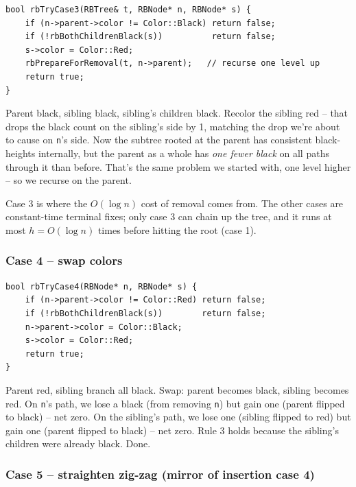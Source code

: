 \documentclass[11pt]{article}
\begin{document}
\begin{lstlisting}[basicstyle=\ttfamily\small,frame=single]
bool rbTryCase3(RBTree& t, RBNode* n, RBNode* s) {
    if (n->parent->color != Color::Black) return false;
    if (!rbBothChildrenBlack(s))          return false;
    s->color = Color::Red;
    rbPrepareForRemoval(t, n->parent);   // recurse one level up
    return true;
}
\end{lstlisting}

Parent black, sibling black, sibling's children black. Recolor the sibling red -- that drops the black count on the sibling's side by 1, matching the drop we're about to cause on \texttt{n}'s side. Now the subtree rooted at the parent has consistent black-heights internally, but the parent as a whole has \emph{one fewer black} on all paths through it than before. That's the same problem we started with, one level higher -- so we recurse on the parent.

\begin{ideabox}
Case 3 is where the $O(\log n)$ cost of removal comes from. The other cases are constant-time terminal fixes; only case 3 can chain up the tree, and it runs at most $h = O(\log n)$ times before hitting the root (case 1).
\end{ideabox}

\subsubsection*{Case 4 -- swap colors}

\begin{lstlisting}[basicstyle=\ttfamily\small,frame=single]
bool rbTryCase4(RBNode* n, RBNode* s) {
    if (n->parent->color != Color::Red) return false;
    if (!rbBothChildrenBlack(s))        return false;
    n->parent->color = Color::Black;
    s->color = Color::Red;
    return true;
}
\end{lstlisting}

Parent red, sibling branch all black. Swap: parent becomes black, sibling becomes red. On \texttt{n}'s path, we lose a black (from removing \texttt{n}) but gain one (parent flipped to black) -- net zero. On the sibling's path, we lose one (sibling flipped to red) but gain one (parent flipped to black) -- net zero. Rule 3 holds because the sibling's children were already black. Done.

\subsubsection*{Case 5 -- straighten zig-zag (mirror of insertion case 4)}
\end{document}
